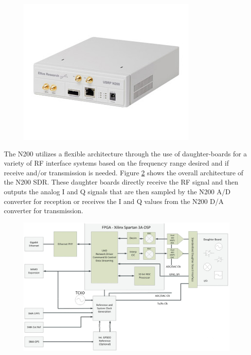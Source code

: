 {\begin{figure}[h!tb] 
\centering
\includegraphics{Images/n200}
\label{N200}
\end{figure}
}

The N200 utilizes a flexible architecture through the use of daughter-boards for a variety of RF interface systems based on the frequency range desired and if receive and/or transmission is needed.  Figure \ref{N200_block} shows the overall architecture of the N200 SDR.  These daughter boards directly receive the RF signal and then outputs the analog I and Q signals that are then sampled by the N200 A/D converter for reception or receives the I and Q values from the N200 D/A converter for transmission. 

{\begin{figure}[h!tb] 
\centering
\includegraphics[width=14cm]{Images/n200_block_edited}
\label{N200_block}
\end{figure}
}

